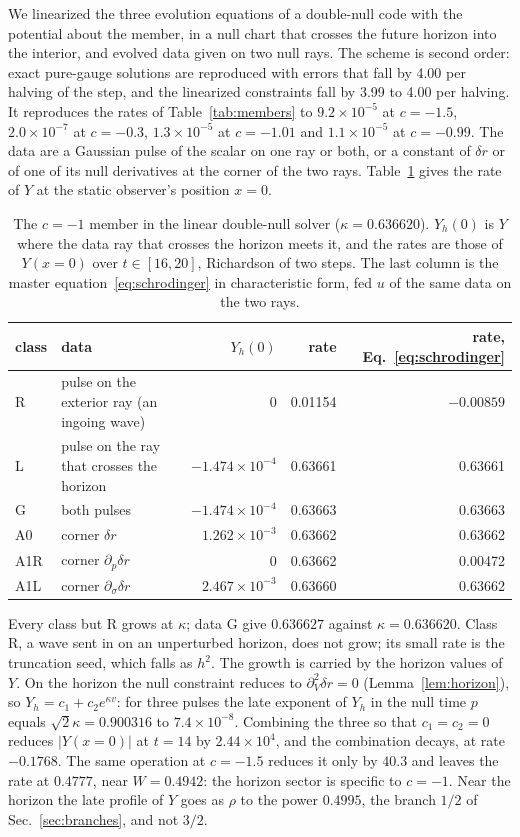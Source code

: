 \documentclass[11pt]{article}
\theoremstyle{plain}
\begin{document}
We linearized the three evolution equations of a double-null code with the potential about the member, in a null chart that
crosses the future horizon into the interior, and evolved data given on two null rays. The scheme is second order: exact
pure-gauge solutions are reproduced with errors that fall by 4.00 per halving of the step, and the linearized constraints
fall by 3.99 to 4.00 per halving. It reproduces the rates of Table~\ref{tab:members} to $9.2\times10^{-5}$ at $c=-1.5$, $2.0\times10^{-7}$
at $c=-0.3$, $1.3\times10^{-5}$ at $c=-1.01$ and $1.1\times10^{-5}$ at $c=-0.99$. The data are a Gaussian pulse of the scalar
on one ray or both, or a constant of $\delta r$ or of one of its null derivatives at the corner of the two rays.
Table~\ref{tab:classes} gives the rate of $Y$ at the static observer's position $x=0$.
\nopagebreak
\begin{table}[H]
\centering
\caption{The $c=-1$ member in the linear double-null solver ($\kappa=0.636620$). $Y_h(0)$ is $Y$ where the data ray that
crosses the horizon meets it, and the rates are those of $Y(x=0)$ over $t\in[16,20]$, Richardson of two steps. The last column is the
master equation~\eqref{eq:schrodinger} in characteristic form, fed $u$ of the same data on the two rays.}
\label{tab:classes}
\begin{tabular}{llrrr}
\toprule
class & data & $Y_h(0)$ & rate & rate, Eq.~\eqref{eq:schrodinger} \\
\midrule
R & pulse on the exterior ray (an ingoing wave) & 0 & 0.01154 & $-0.00859$ \\
L & pulse on the ray that crosses the horizon & $-1.474\times10^{-4}$ & 0.63661 & 0.63661 \\
G & both pulses & $-1.474\times10^{-4}$ & 0.63663 & 0.63663 \\
A0 & corner $\delta r$ & $1.262\times10^{-3}$ & 0.63662 & 0.63662 \\
A1R & corner $\partial_p\delta r$ & 0 & 0.63662 & 0.00472 \\
A1L & corner $\partial_\sigma\delta r$ & $2.467\times10^{-3}$ & 0.63660 & 0.63662 \\
\bottomrule
\end{tabular}
\end{table}

Every class but R grows at $\kappa$; data G give $0.636627$ against $\kappa=0.636620$. Class R, a wave
sent in on an unperturbed horizon, does not grow; its small rate is the truncation seed, which falls as $h^2$. The growth is
carried by the horizon values of $Y$. On the horizon the null constraint reduces to $\partial^2_V\delta r=0$ (Lemma~\ref{lem:horizon}), so
$Y_h=c_1+c_2e^{\kappa v}$: for three pulses the late exponent of $Y_h$ in the null time $p$ equals $\sqrt2\kappa=0.900316$
to $7.4\times10^{-8}$. Combining the three so that $c_1=c_2=0$ reduces $|Y(x=0)|$ at $t=14$ by $2.44\times10^4$, and the
combination decays, at rate $-0.1768$. The same operation at $c=-1.5$ reduces it only by $40.3$ and leaves the rate at $0.4777$,
near $W=0.4942$: the horizon sector is specific to $c=-1$. Near the horizon the late profile of $Y$ goes as $\rho$ to the
power $0.4995$, the branch $1/2$ of Sec.~\ref{sec:branches}, and not $3/2$.
\end{document}
